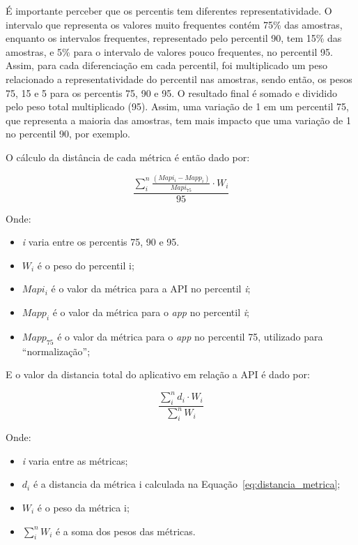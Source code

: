 É importante perceber que os percentis tem diferentes representatividade. O intervalo que representa os valores muito frequentes contém 75\% das amostras, enquanto os intervalos frequentes, representado pelo percentil 90, tem 15\% das amostras, e 5\% para o intervalo de valores pouco frequentes, no percentil 95. Assim, para cada diferenciação em cada percentil, foi multiplicado um peso relacionado a representatividade do percentil nas amostras, sendo então, os pesos 75, 15 e 5 para os percentis 75, 90 e 95. O resultado final é somado e dividido pelo peso total multiplicado (95). Assim, uma variação de 1 em um percentil 75, que representa a maioria das amostras, tem mais impacto que uma variação de 1 no percentil 90, por exemplo.

O cálculo da distância de cada métrica é então dado por:
\begin{center}
\begin{equation}\label{eq:distancia_metrica}
\displaystyle \frac{\sum_{i}^{n} \frac{(Mapi_i-Mapp_i)}{Mapi_{75}}\cdot W_i}{95}
\end{equation}
\end{center}

Onde:
\begin{itemize}
\item \textit{i} varia entre os percentis 75, 90 e 95. 
\item $W_i$ é o peso do percentil i;
\item $Mapi_i$ é o valor da métrica para a API no percentil \textit{i};
\item $Mapp_i$ é o valor da métrica para o \textit{app} no percentil \textit{i};
\item $Mapp_{75}$ é o valor da métrica para o \textit{app} no percentil 75, utilizado para ``normalização'';
\end{itemize}

E o valor da distancia total do aplicativo em relação a API é dado por:

\begin{center}
\begin{equation} \label{eq:distancia_total}
\displaystyle \frac{\sum_{i}^{n} d_i\cdot W_i}{\sum_{i}^{n} W_i}
\end{equation}
\end{center}

Onde:
\begin{itemize}
\item \textit{i} varia entre as métricas;
\item $d_i$ é a distancia da métrica i calculada na Equação~\ref{eq:distancia_metrica};
\item $W_i$ é o peso da métrica i;
\item $\sum_{i}^{n} W_i$ é a soma dos pesos das métricas.
\end{itemize}

